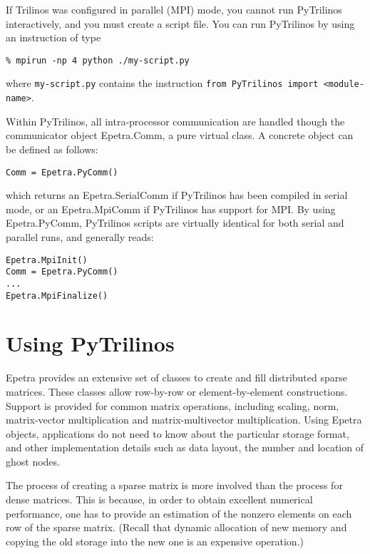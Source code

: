 \documentclass[10pt,relax]{SANDreport}
\begin{document}
If Trilinos was configured in parallel (MPI) mode, you cannot run PyTrilinos
interactively, and you must create a script file. You can run PyTrilinos by
using an instruction of type
\begin{verbatim}
% mpirun -np 4 python ./my-script.py
\end{verbatim}
where \verb!my-script.py! contains the instruction \verb!from PyTrilinos import <module-name>!.

Within PyTrilinos, all intra-processor communication are handled though the
communicator object Epetra.Comm, a pure virtual class. A concrete object can
be defined as follows:
\begin{verbatim}
Comm = Epetra.PyComm()
\end{verbatim}
which returns an Epetra.SerialComm if PyTrilinos has been compiled in serial
mode, or an Epetra.MpiComm if PyTrilinos has support for MPI. By using
Epetra.PyComm, PyTrilinos scripts are virtually identical for both serial and
parallel runs, and generally reads:
\begin{verbatim}
Epetra.MpiInit()
Comm = Epetra.PyComm()
...
Epetra.MpiFinalize()
\end{verbatim}

\section{Using PyTrilinos}
\label{sec:using}

Epetra provides an extensive set of classes to create and fill
distributed sparse matrices. These classes allow row-by-row or
element-by-element constructions. Support is provided for common matrix
operations, including scaling, norm, matrix-vector multiplication and
matrix-multivector multiplication.
Using Epetra objects, applications do not need to know about the
particular storage format, and other implementation details such as data
layout, the number and location of ghost nodes. 

The process of creating a sparse matrix is more involved than the
process for dense matrices. This is because, in order to obtain
excellent numerical performance, one has to provide an estimation of
the nonzero elements on each row of the sparse matrix. (Recall that
dynamic allocation of new memory and copying the old storage into the
new one is an expensive operation.)
\end{document}
